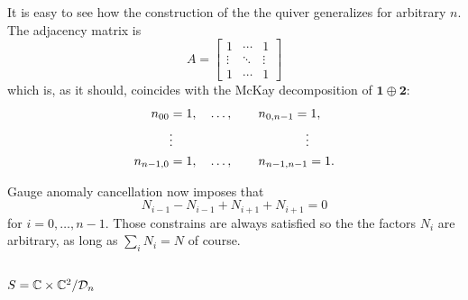 \documentclass[a4paper,10pt]{article}
\begin{document}
        It is easy to see how the construction of the the quiver generalizes for arbitrary $n$. The adjacency matrix is
        \begin{equation}
            A=
            \begin{bmatrix}
                1 & \cdots & 1 \\
                \vdots & \ddots & \vdots \\
                1 & \cdots & 1
            \end{bmatrix}
        \end{equation}
        which is, as it should, coincides with the McKay decomposition of $\boldsymbol{1}\oplus\boldsymbol{2}$:
        \begin{align}
            \begin{split}
                n_{00} &= 1,\quad\dots,\qquad n_{0,n-1}=1,\\
                &\vdots\hspace{3.7cm}\vdots\\
                n_{n-1,0} &= 1,\quad\dots,\qquad n_{n-1,n-1}=1.
            \end{split}
        \end{align}
        
        Gauge anomaly cancellation now imposes that
        \begin{equation}
            N_{i-1}-N_{i-1}+N_{i+1}+N_{i+1}=0
        \end{equation}
        for $i=0,\dots,n-1$. Those constrains are always satisfied so the the factors $N_i$ are arbitrary, as long as $\sum_iN_i=N$ of course.

    \subsection{$S=\mathbb{C}\times\mathbb{C}^2/\mathcal{D}_n$}
\end{document}

